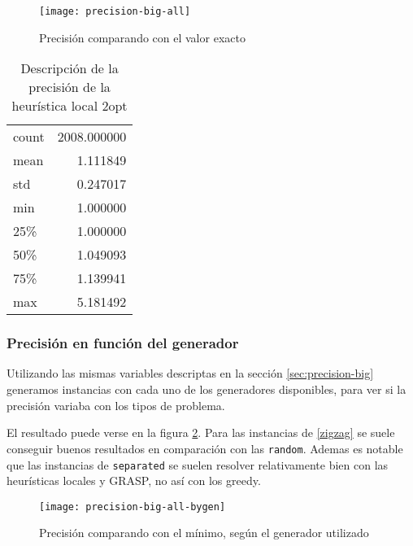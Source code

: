 \begin{figure}[H]
    \centering
    \texttt{[image: precision-big-all]}
    \caption{Precisión comparando con el valor exacto}
    \label{fig:precision-big-all}
\end{figure}

\begin{table}[H]
    \begin{center}
        \begin{tabular}{ l | r }
            count  & 2008.000000 \\
            mean   &    1.111849 \\
            std    &    0.247017 \\
            min    &    1.000000 \\
            25\%   &    1.000000 \\
            50\%   &    1.049093 \\
            75\%   &    1.139941 \\
            max    &    5.181492 \\
        \end{tabular}
        \caption{Descripción de la precisión de la heurística local 2opt}\label{tab:precision-big-local-2opt}
    \end{center}
\end{table}

\subsubsection{Precisión en función del generador}

Utilizando las mismas variables descriptas en la sección \ref{sec:precision-big} generamos instancias con cada uno de los generadores
disponibles, para ver si la precisión variaba con los tipos de problema.

El resultado puede verse en la figura \ref{fig:precision-big-all-bygen}.
Para las instancias de \ref{zigzag} se suele conseguir buenos resultados en comparación con las \texttt{random}.
Ademas es notable que las instancias de \texttt{separated} se suelen resolver relativamente bien con las heurísticas locales y GRASP,
no así con los greedy.

\begin{figure}[H]
    \centering
    \texttt{[image: precision-big-all-bygen]}
    \caption{Precisión comparando con el mínimo, según el generador utilizado}
    \label{fig:precision-big-all-bygen}
\end{figure}

